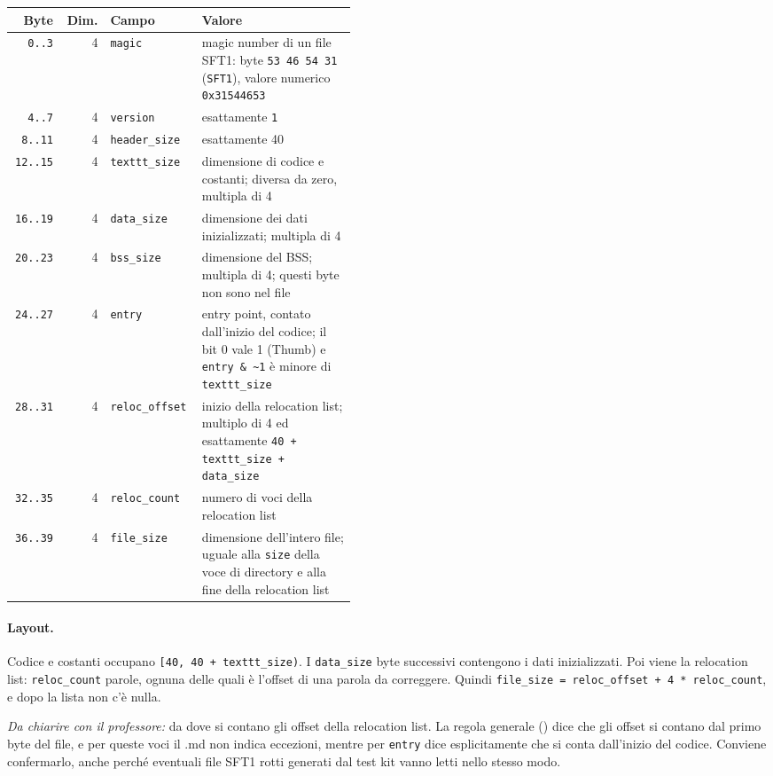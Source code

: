 \begin{center}
\small
\begin{tabular}{|r|r|l|p{0.45\linewidth}|}
\hline
Byte & Dim. & Campo & \raggedright Valore \tabularnewline
\hline\hline
\texttt{0..3} & 4 & \texttt{magic} & \raggedright magic number di un file SFT1: byte \texttt{53 46 54 31} (\texttt{SFT1}), valore numerico \texttt{0x31544653} \tabularnewline
\hline
\texttt{4..7} & 4 & \texttt{version} & \raggedright esattamente \texttt{1} \tabularnewline
\hline
\texttt{8..11} & 4 & \texttt{header\_size} & \raggedright esattamente 40 \tabularnewline
\hline
\texttt{12..15} & 4 & \texttt{texttt\_size} & \raggedright dimensione di codice e costanti; diversa da zero, multipla di 4 \tabularnewline
\hline
\texttt{16..19} & 4 & \texttt{data\_size} & \raggedright dimensione dei dati inizializzati; multipla di 4 \tabularnewline
\hline
\texttt{20..23} & 4 & \texttt{bss\_size} & \raggedright dimensione del BSS; multipla di 4; questi byte non sono nel file \tabularnewline
\hline
\texttt{24..27} & 4 & \texttt{entry} & \raggedright entry point, contato dall'inizio del codice; il bit 0 vale 1 (Thumb) e \texttt{entry \& \textasciitilde{}1} è minore di \texttt{texttt\_size} \tabularnewline
\hline
\texttt{28..31} & 4 & \texttt{reloc\_offset} & \raggedright inizio della relocation list; multiplo di 4 ed esattamente \texttt{40 + texttt\_size + data\_size} \tabularnewline
\hline
\texttt{32..35} & 4 & \texttt{reloc\_count} & \raggedright numero di voci della relocation list \tabularnewline
\hline
\texttt{36..39} & 4 & \texttt{file\_size} & \raggedright dimensione dell'intero file; uguale alla \texttt{size} della voce di directory e alla fine della relocation list \tabularnewline
\hline
\end{tabular}
\end{center}

\paragraph{Layout.} Codice e costanti occupano \texttt{[40, 40 + texttt\_size)}. I \texttt{data\_size} byte successivi contengono i dati inizializzati. Poi viene la relocation list: \texttt{reloc\_count} parole, ognuna delle quali è l'offset di una parola da correggere. Quindi \texttt{file\_size = reloc\_offset + 4 * reloc\_count}, e dopo la lista non c'è nulla.

\emph{Da chiarire con il professore:} da dove si contano gli offset della relocation list. La regola generale () dice che gli offset si contano dal primo byte del file, e per queste voci il .md non indica eccezioni, mentre per \texttt{entry} dice esplicitamente che si conta dall'inizio del codice. Conviene confermarlo, anche perché eventuali file SFT1 rotti generati dal test kit vanno letti nello stesso modo.

